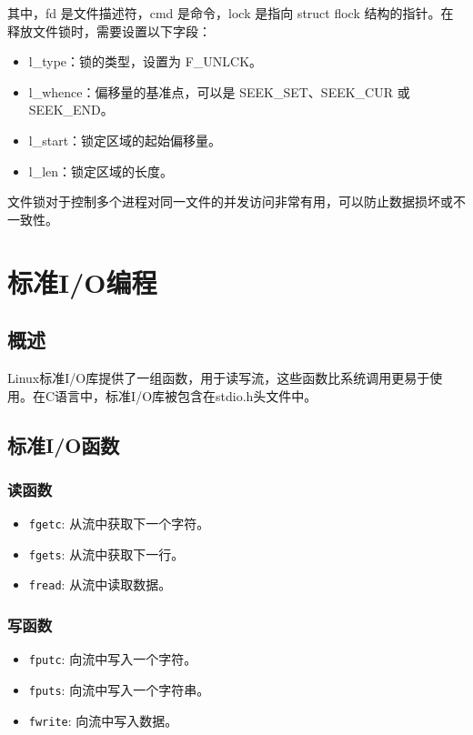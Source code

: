 \documentclass[12pt, a4paper, oneside]{ctexbook}
\numberwithin{figure}{section}
\begin{document}
其中，fd 是文件描述符，cmd 是命令，lock 是指向 struct flock 结构的指针。在释放文件锁时，需要设置以下字段：

\begin{itemize}
\item l_type：锁的类型，设置为 F_UNLCK。
\item l_whence：偏移量的基准点，可以是 SEEK_SET、SEEK_CUR 或 SEEK_END。
\item l_start：锁定区域的起始偏移量。
\item l_len：锁定区域的长度。
\end{itemize}

文件锁对于控制多个进程对同一文件的并发访问非常有用，可以防止数据损坏或不一致性。

\section{标准I/O编程}

\subsection{概述}

Linux标准I/O库提供了一组函数，用于读写流，这些函数比系统调用更易于使用。在C语言中，标准I/O库被包含在stdio.h头文件中。

\subsection{标准I/O函数}

\subsubsection{读函数}

\begin{itemize}
    \item \texttt{fgetc}: 从流中获取下一个字符。
    \item \texttt{fgets}: 从流中获取下一行。
    \item \texttt{fread}: 从流中读取数据。
\end{itemize}

\subsubsection{写函数}

\begin{itemize}
    \item \texttt{fputc}: 向流中写入一个字符。
    \item \texttt{fputs}: 向流中写入一个字符串。
    \item \texttt{fwrite}: 向流中写入数据。
\end{itemize}
\end{document}
